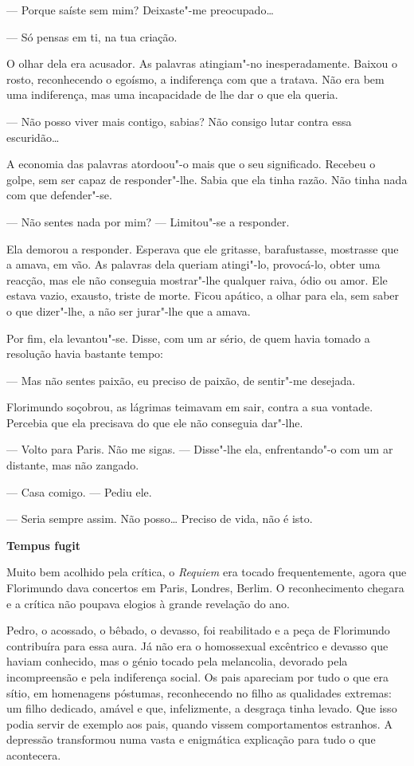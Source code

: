 --- Porque saíste sem mim? Deixaste"-me preocupado\ldots{}

--- Só pensas em ti, na tua criação.

O olhar dela era acusador. As palavras atingiam"-no inesperadamente.
Baixou o rosto, reconhecendo o egoísmo, a indiferença com que a tratava.
Não era bem uma indiferença, mas uma incapacidade de lhe dar o que ela
queria.

--- Não posso viver mais contigo, sabias? Não consigo lutar contra essa
escuridão\ldots{}

A economia das palavras atordoou"-o mais que o seu significado. Recebeu o
golpe, sem ser capaz de responder"-lhe. Sabia que ela tinha razão. Não
tinha nada com que defender"-se.

--- Não sentes nada por mim? ---  Limitou"-se a responder.

Ela demorou a responder. Esperava que ele gritasse, barafustasse,
mostrasse que a amava, em vão. As palavras dela queriam atingi"-lo,
provocá-lo, obter uma reacção, mas ele não conseguia mostrar"-lhe
qualquer raiva, ódio ou amor. Ele estava vazio, exausto, triste de
morte. Ficou apático, a olhar para ela, sem saber o que dizer"-lhe, a não
ser jurar"-lhe que a amava.

Por fim, ela levantou"-se. Disse, com um ar sério, de quem havia tomado a
resolução havia bastante tempo:

--- Mas não sentes paixão, eu preciso de paixão, de sentir"-me desejada.

Florimundo soçobrou, as lágrimas teimavam em sair, contra a sua vontade.
Percebia que ela precisava do que ele não conseguia dar"-lhe.

--- Volto para Paris. Não me sigas. ---  Disse"-lhe ela, enfrentando"-o com um
ar distante, mas não zangado.

--- Casa comigo. --- Pediu ele.

--- Seria sempre assim. Não posso\ldots{} Preciso de vida, não é isto.

\vspace*{1.8cm}
\noindent{}\textbf{Tempus fugit}

Muito bem acolhido pela crítica, o \emph{Requiem }era tocado
frequentemente, agora que Florimundo dava concertos em Paris, Londres,
Berlim. O reconhecimento chegara e a crítica não poupava elogios à
grande revelação do ano.

Pedro, o acossado, o bêbado, o devasso, foi reabilitado e a peça de
Florimundo contribuíra para essa aura. Já não era o homossexual
excêntrico e devasso que haviam conhecido, mas o génio tocado pela
melancolia, devorado pela incompreensão e pela indiferença social. Os
pais apareciam por tudo o que era sítio, em homenagens póstumas,
reconhecendo no filho as qualidades extremas: um filho dedicado, amável
e que, infelizmente, a desgraça tinha levado. Que isso podia servir de
exemplo aos pais, quando vissem comportamentos estranhos. A depressão
transformou numa vasta e enigmática explicação para tudo o que
acontecera.

